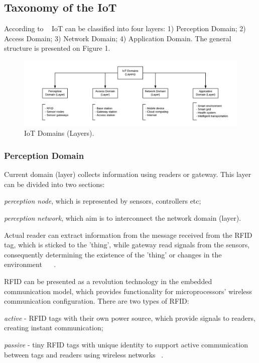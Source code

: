 \documentclass[12pt]{article}
\begin{document}
\subsection{Taxonomy of the IoT}
According to ~\cite{SSAIoT} IoT can be classified into four layers: 1) Perception Domain; 2) Access Domain; 3) Network Domain; 4) Application Domain. The general structure is presented on Figure 1.

\begin{figure} [H] %
	\begin{center}
		\includegraphics[width=1\textwidth]{IoT_Domains}
		\caption{IoT Domains (Layers).}
		\label{fig:ref_model}
	\end{center}
\end{figure}


\subsubsection{Perception Domain}
Current domain (layer) collects information using readers or gateway. This layer can be divided into two sections:
\begin{enumerate*}[label=(\roman*)]
 \item \textit{perception node}, which is represented by sensors, controllers etc; 
 \item \textit{perception network}, which aim is to interconnect the network domain (layer).  
\end{enumerate*}
Actual reader can extract information from the message received from the RFID tag, which is sticked to the 'thing', while gateway read signals from the sensors, consequently determining the existence of the 'thing' or changes in the environment ~\cite{SSAIoT} ~\cite{IoTSur}.

RFID can be presented as a revolution technology in the embedded communication model, which provides functionality for microprocessors' wireless communication configuration. There are two types of RFID:
\begin{enumerate*}[label=(\roman*)]
 \item \textit{active} - RFID tags with their own power source, which provide signals to readers, creating instant communication; 
 \item \textit{passive} - tiny RFID tags with unique identity to support active communication between tags and readers using wireless networks ~\cite{SSAIoT}.
\end{enumerate*}
\end{document}
